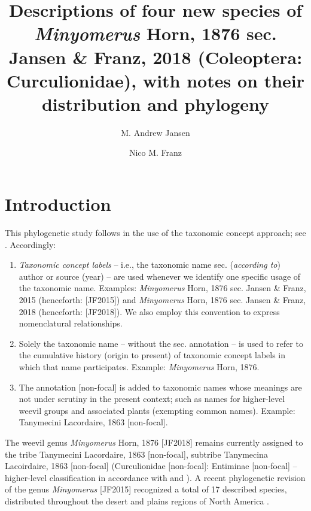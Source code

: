 \documentclass[fleqn,10pt,lineno]{wlpeerj} %
\title{Descriptions of four new species of \textit{Minyomerus} Horn, 1876 sec. Jansen \& Franz, 2018 (Coleoptera: Curculionidae), with notes on their distribution and phylogeny}
\author[1]{M. Andrew Jansen}
\author[2]{Nico M. Franz}
\affil[1]{School of Life Sciences, 427 E Tyler Mall, PO Box 874501, Tempe, AZ 85287}
\affil[2]{ASU Natural History Collections, 734 W Alameda Dr, Tempe, AZ 85282}
\begin{document}
\flushbottom
\maketitle
\thispagestyle{empty}

\section*{Introduction}\label{sec:intro}
	This phylogenetic study follows \citet{jansen2015} in the use of the taxonomic concept approach; see \citet{fp2009, fea2016a, fea2016b}. 
	Accordingly:
	
	\begin{enumerate}[itemsep=-0.4em]
		\item \textit{Taxonomic concept labels} -- i.e., the taxonomic name sec. (\textit{according to}) author or source (year) -- are used whenever we identify one specific usage of the taxonomic name.
		Examples: \textit{Minyomerus} Horn, 1876 sec. Jansen \& Franz, 2015 (henceforth: [JF2015]) and \textit{Minyomerus} Horn, 1876 sec. Jansen \& Franz, 2018 (henceforth: [JF2018]). 
		We also employ this convention to express nomenclatural relationships. 
		\item Solely the taxonomic name -- without the sec. annotation -- is used to refer to the cumulative history (origin to present) of taxonomic concept labels in which that name participates. 
		Example: \textit{Minyomerus} Horn, 1876.
		\item The annotation [non-focal] is added to taxonomic names whose meanings are not under scrutiny in the present context; such as names for higher-level weevil groups and associated plants (exempting common names).
		Example: Tanymecini Lacordaire, 1863 [non-focal].
	\end{enumerate}
	
	The weevil genus \textit{Minyomerus} Horn, 1876 [JF2018] remains currently assigned to the tribe Tanymecini Lacordaire, 1863 [non-focal], subtribe Tanymecina Lacoirdaire, 1863 [non-focal] (Curculionidae [non-focal]: Entiminae [non-focal] -- higher-level classification in accordance with \citealt{alonso1999} and \citealt{bouchard2011}). 
	A recent phylogenetic revision of the genus \textit{Minyomerus} [JF2015] recognized a total of 17 described species, distributed throughout the desert and plains regions of North America \citep{jansen2015}.
	
\end{document}
